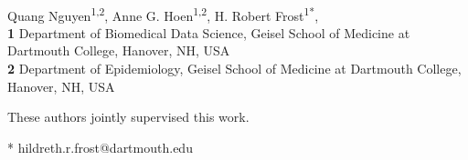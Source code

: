 \documentclass[10pt,letterpaper]{article}
\begin{document}
\vspace*{0.2in}

\begin{flushleft}
{\Large
\textbf{} %
}
\newline
\\
Quang Nguyen\textsuperscript{1,2},
Anne G. Hoen\textsuperscript{1,2\ddag},
H. Robert Frost\textsuperscript{1*\ddag},
\\
\bigskip
\textbf{1} Department of Biomedical Data Science, Geisel School of Medicine at Dartmouth College, Hanover, NH, USA
\\
\textbf{2} Department of Epidemiology, Geisel School of Medicine at Dartmouth College, Hanover, NH, USA
\\
\bigskip

% 
%

\ddag These authors jointly supervised this work.




* hildreth.r.frost@dartmouth.edu

\end{flushleft}
\end{document}
